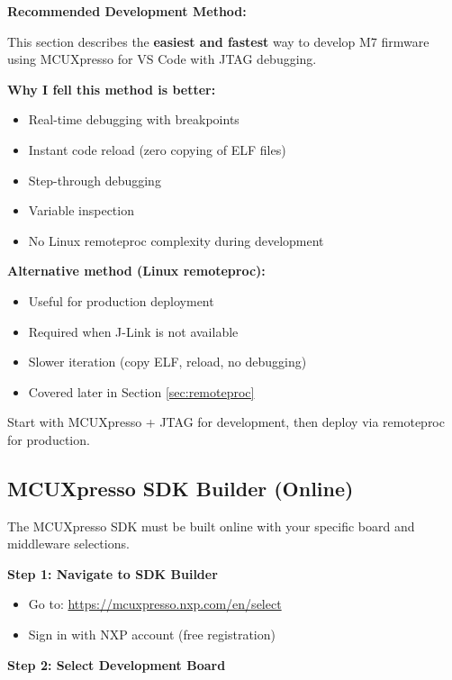 \documentclass[12pt,a4paper]{report}
\begin{document}
\begin{important}
\textbf{Recommended Development Method:}

This section describes the \textbf{easiest and fastest} way to develop M7 firmware using MCUXpresso for VS Code with JTAG debugging.

\textbf{Why I fell this method is better:}
\begin{itemize}
    \item Real-time debugging with breakpoints
    \item Instant code reload (zero copying of ELF files)
    \item Step-through debugging
    \item Variable inspection
    \item No Linux remoteproc complexity during development
\end{itemize}

\textbf{Alternative method (Linux remoteproc):}
\begin{itemize}
    \item Useful for production deployment
    \item Required when J-Link is not available
    \item Slower iteration (copy ELF, reload, no debugging)
    \item Covered later in Section \ref{sec:remoteproc}
\end{itemize}

Start with MCUXpresso + JTAG for development, then deploy via remoteproc for production.
\end{important}

\subsection{MCUXpresso SDK Builder (Online)}

The MCUXpresso SDK must be built online with your specific board and middleware selections.

\textbf{Step 1: Navigate to SDK Builder}

\begin{itemize}
    \item Go to: \url{https://mcuxpresso.nxp.com/en/select}
    \item Sign in with NXP account (free registration)
\end{itemize}


\textbf{Step 2: Select Development Board}
\end{document}
